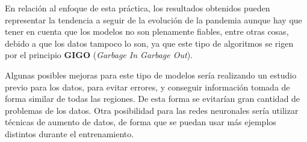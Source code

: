 \documentclass[12pt,a4paper, xcolor=table]{article}
\begin{document}
    \vspace{2mm}

    En relación al enfoque de esta práctica, los resultados obtenidos pueden representar la tendencia a seguir de la evolución de la pandemia aunque hay que tener en cuenta que los modelos no son plenamente fiables, entre otras cosas, debido a que los datos tampoco lo son, ya que este tipo de algoritmos se rigen por el principio \textbf{GIGO} (\textit{Garbage In Garbage Out}).

    \vspace{2mm}

    Algunas posibles mejoras para este tipo de modelos sería realizando un estudio previo para los datos, para evitar errores, y conseguir información tomada de forma similar de todas las regiones. De esta forma se evitarían gran cantidad de problemas de los datos. Otra posibilidad para las redes neuronales sería utilizar técnicas de aumento de datos, de forma que se puedan usar más ejemplos distintos durante el entrenamiento.




\clearpage
\end{document}
